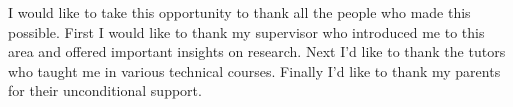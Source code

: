 \begin{thanks}
	I would like to take this opportunity to thank all the people who made this possible. First I would like to thank my supervisor who introduced me to this area and offered important insights on research. Next I'd like to thank the tutors who taught me in various technical courses. Finally I'd like to thank my parents for their unconditional support. 

\end{thanks}

